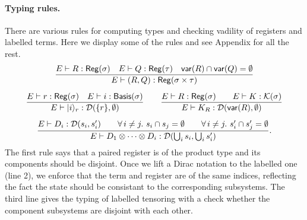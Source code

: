 \paragraph*{Typing rules.}
There are various rules for computing types and checking vadility of registers and labelled terms. Here we display some of the rules and see Appendix for all the rest.
\begin{gather*}
  \frac{
      E \vdash R : \mathsf{Reg}(\sigma) \quad
      E \vdash Q : \mathsf{Reg}(\tau)
      \quad \mathsf{var}(R) \cap \mathsf{var}(Q) = \emptyset
  }{E \vdash (R,Q) : \mathsf{Reg}(\sigma \times \tau)} \\[0.2cm]
  \frac{
          E \vdash r : \mathsf{Reg}(\sigma) \quad
          E \vdash i : \mathsf{Basis}(\sigma)}
  {E \vdash |i\rangle_r : \mathcal{D}(\{r\}, \emptyset)}
  \qquad
  \frac{E \vdash R : \mathsf{Reg}(\sigma)\qquad E \vdash K : \mathcal{K}(\sigma)}{E \vdash K_R : \mathcal{D}(\mathsf{var}(R), \emptyset)} \\[0.2cm]
    \frac{
        E \vdash D_i : \mathcal{D}(s_i,s_i') \qquad
        \forall\,i\neq j.\ s_i\cap s_j = \emptyset \qquad
        \forall\,i\neq j.\ s'_i\cap s'_j = \emptyset
    }
    {E \vdash D_1 \otimes \cdots \otimes D_i : \mathcal{D}(\bigcup_i s_i, \bigcup_i s_i')}.
\end{gather*}
The first rule says that a paired register is of the product type and its components should be disjoint.
Once we lift a Dirac notation to the labelled one (line 2), we enforce that the term and register are of the same indices, reflecting the fact the state should be consistant to the corresponding subsystems.
The third line gives the typing of labelled tensoring with a check whether the component subsystems are disjoint with each other.


